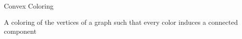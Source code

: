 \begin{frame}{Convex Coloring}

A coloring of the vertices of a graph such that every color induces a connected component

\pause

\end{frame}
